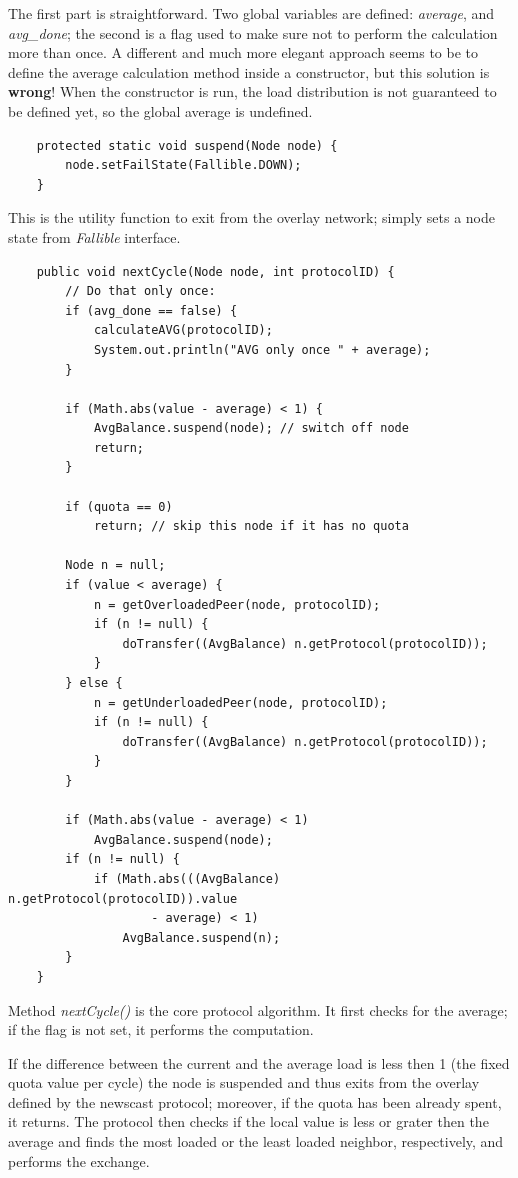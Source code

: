 \documentclass[a4paper,11pt]{article}
\begin{document}
The first part is straightforward. Two global variables are defined:
\emph{average}, and \emph{avg\_done}; the second is a flag used to make
sure not to
perform the calculation more than once. A different and much more
elegant approach seems to be to define the average calculation method inside
a constructor, but this solution is \textbf{wrong}! When the
constructor is run, the load distribution is not guaranteed to be defined
yet, so the global average is undefined.
\footnotesize
\begin{verbatim}
    protected static void suspend(Node node) {
        node.setFailState(Fallible.DOWN);
    }
\end{verbatim}
\normalsize
This is the utility function to exit from the overlay network; simply sets
a node state from \emph{Fallible} interface.
\footnotesize
\begin{verbatim}
    public void nextCycle(Node node, int protocolID) {
        // Do that only once:
        if (avg_done == false) {
            calculateAVG(protocolID);
            System.out.println("AVG only once " + average);
        }

        if (Math.abs(value - average) < 1) {
            AvgBalance.suspend(node); // switch off node
            return;
        }

        if (quota == 0)
            return; // skip this node if it has no quota

        Node n = null;
        if (value < average) {
            n = getOverloadedPeer(node, protocolID);
            if (n != null) {
                doTransfer((AvgBalance) n.getProtocol(protocolID));
            }
        } else {
            n = getUnderloadedPeer(node, protocolID);
            if (n != null) {
                doTransfer((AvgBalance) n.getProtocol(protocolID));
            }
        }

        if (Math.abs(value - average) < 1)
            AvgBalance.suspend(node);
        if (n != null) {
            if (Math.abs(((AvgBalance) n.getProtocol(protocolID)).value
                    - average) < 1)
                AvgBalance.suspend(n);
        }
    }
\end{verbatim}
\normalsize
Method \emph{nextCycle()} is the core protocol algorithm. It first
checks for the average; if the flag is not set, it performs
the computation.

If the difference between the current and the average load is less
then 1 (the fixed quota value per cycle) the node is suspended and
thus exits from the overlay defined by the newscast protocol; moreover,
if the quota has been already spent, it returns. The protocol then
checks if the local value is less or grater then the average and
finds the most loaded or the least loaded neighbor, respectively, and
performs the exchange.
\end{document}
